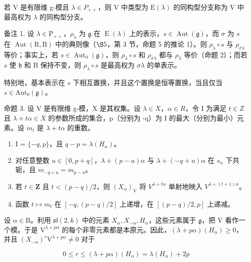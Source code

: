 若 V 是有限维 g-模且 \(\lambda\in P_{++}\)，则 V 中类型为 \(\mathrm{E}(\lambda)\) 的同构型分支称为 V 中最高权为 \(\lambda\) 的同构型分支。

备注 1. 设 \(\lambda \in \mathrm{P}_{++}\)，\(\rho_{\lambda}\) 为 \(\mathfrak{g}\) 在 \(\operatorname{E}(\lambda)\) 上的表示，\(s \in \operatorname{Aut}(\mathfrak{g})\)，而 \(\sigma\) 为 \(s\) 在 \(\operatorname{Aut}(\mathrm{R},\mathrm{B})\) 中的典则像（\(\S 5\)，第 3 节，命题 5 的推论 1）。则 \(\rho_{\lambda} \circ s\) 与 \(\rho_{\sigma \lambda}\) 等价；事实上，若 \(s \in \operatorname{Aut}_0(\mathfrak{g})\)，则 \(\rho_{\lambda} \circ s\) 和 \(\rho_{\sigma \lambda}\) 都与 \(\rho_{\lambda}\) 等价（命题 2）；而若 \(s\) 使 \(\mathfrak{h}\) 和 B 保持不变，则 \(\rho_{\lambda} \circ s\) 是最高权为 \(\sigma \lambda\) 的单表示。

特别地，基本表示在 \(s\) 下相互置换，并且这个置换是恒等置换，当且仅当 \(s \in \mathrm{Aut}_0(\mathfrak{g})\)。

命题 3. 设 V 是有限维 g-模，X 是其权集。设 \(\lambda \in X\)，\(\alpha \in R\)，令 I 为满足 \(t \in Z\) 且 \(\lambda + t\alpha \in X\) 的参数所成的集合，p（分别为 -q）为 I 的最大（分别为最小）元素。设 \(m_t\) 是 \(\lambda + t\alpha\) 的重数。

\begin{enumerate}
\def\labelenumi{(\roman{enumi})}
\item
  I = \(\{-q, p\}\)，且 \(q - p = \lambda(H_{\alpha})\)。
\item
  对任意整数 \(u \in [0, p + q]\)，\(\lambda + (p - u)\alpha\) 与 \(\lambda + (-q + u)\alpha\) 在 \(s_{\alpha}\) 下共轭，且 \(m_{-q + u} = m_{p - u}\)。
\item
  若 \(t \in \mathbf{Z}\) 且 \(t < (p - q)/2\)，则 \((X_{\alpha})_{\mathrm{V}}\) 将 \(V^{\lambda + t\alpha}\) 单射地映入 \(V^{\lambda + (t + 1)\alpha}\)。
\item
  函数 \(t \mapsto m_t\) 在 \([-q, (p - q)/2]\) 上递增，在 \([(p - q)/2, p]\) 上递减。
\end{enumerate}

设 \(\alpha \in \mathrm{B}\)。利用 \(\mathfrak{sl}(2,k)\) 中的元素 \(X_{\alpha}, X_{-\alpha}, H_{\alpha}\)，这些元素属于 \(\mathfrak{g}\)，把 V 看作一个模。于是 \(\mathrm{V}^{\lambda + p\alpha}\) 的每个非零元素都是本原元。因此，\((\lambda + p\alpha)(H_{\alpha}) \geq 0\)，并且 \((X_{-\alpha})^{r}\mathrm{V}^{\lambda + p\alpha} \neq 0\) 对于

\[
0 \leq r \leq (\lambda + p \alpha) (H _ {\alpha}) = \lambda (H _ {\alpha}) + 2 p
\]


